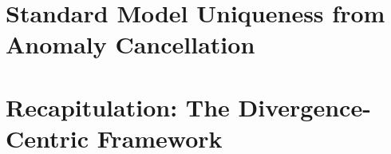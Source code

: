 \documentclass[12pt,a4paper]{article}
\begin{document}
\newpage
\section{Standard Model Uniqueness from Anomaly Cancellation}
\label{sec:standardModelUniqueness}






\newpage
\section{Recapitulation: The Divergence-Centric Framework}
\label{sec:divergenceCentricFramework}











\newpage

\renewcommand{\bibname}{References}

\end{document}
